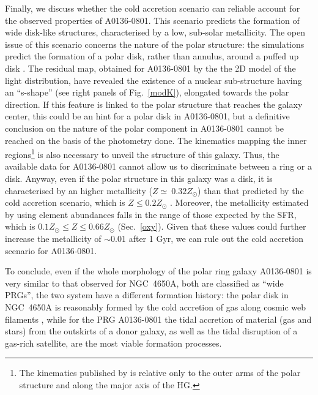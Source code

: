 \documentclass[useAMS,usenatbib]{mn2e}
\begin{document}
Finally, we discuss whether the cold accretion scenario can reliable
account for the observed properties of A0136-0801. This scenario
predicts the formation of wide disk-like structures, characterised by
a low, sub-solar metallicity. 
The open issue of this scenario concerns the nature of the polar structure: the simulations
predict the formation of a polar disk, rather than annulus, around a
puffed up disk \citep{Mac06, Bro08}. The residual map, obtained for A0136-0801
by the the 2D model of the light distribution, have revealed the
existence of a nuclear sub-structure having an ``s-shape'' (see right
panels of Fig.~\ref{modK}), elongated towards the
polar direction. If this feature is linked to the polar structure that
reaches the galaxy center, this could be an hint for a polar disk in
A0136-0801, but a definitive conclusion on the nature of the polar component in A0136-0801 cannot
be reached on the basis of the photometry done. The kinematics mapping the
inner regions\footnote{The kinematics published by \citet{Sch83} is
  relative only to the outer arms of the polar structure and along the
  major axis of the HG. } is also necessary to unveil the structure of this galaxy.
Thus, the available data for A0136-0801 cannot allow us to discriminate between a ring or a
disk. 
Anyway, even if the polar structure in this galaxy was a disk,
it is characterised by an higher metallicity ($Z \simeq\ 0.32 Z_{\odot}$) than that predicted by the cold accretion scenario,
which is $Z \leq 0.2 Z_{\odot}$ \citep{Snaith12}. Moreover, the
metallicity estimated by using element abundances falls in the range
of those expected by the SFR, which is $0.1 Z_{\odot} \le Z \le
0.66 Z_{\odot}$ (Sec.~\ref{oxy}). Given that these values could further
increase the metallicity of $\sim 0.01$ after 1 Gyr, we can rule out
the cold accretion scenario for A0136-0801.

To conclude, even if the whole morphology of the polar ring galaxy
A0136-0801 is very similar to that observed for NGC~4650A, both are
classified as ``wide PRGs'', the two system have a different formation
history: the polar disk in NGC~4650A is reasonably formed by the cold
accretion of gas along cosmic web filaments \citep{Spav10}, while for
the PRG A0136-0801 the tidal accretion of material (gas and stars)
from the outskirts of a donor galaxy, as well as the tidal
  disruption of a gas-rich satellite, are the most viable formation
processes.

\end{document}
